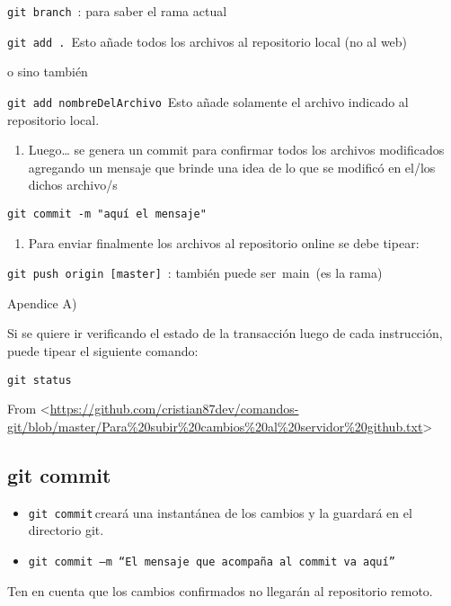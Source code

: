 \documentclass[
  a2paper,
]{article}
\providecommand{\tightlist}{%
  \setlength{\itemsep}{0pt}\setlength{\parskip}{0pt}}\usepackage{longtable,booktabs,array}
\begin{document}
\texttt{git\ branch}~: para saber el rama actual

\texttt{git\ add\ .}~Esto añade todos los archivos al repositorio local
(no al web)

o sino también

\texttt{git\ add\ nombreDelArchivo}~Esto añade solamente el archivo
indicado al repositorio local.

\begin{enumerate}
\def\labelenumi{\arabic{enumi})}
\setcounter{enumi}{1}
\tightlist
\item
  Luego\ldots{} se genera un commit para confirmar todos los archivos
  modificados agregando un mensaje que brinde una idea de lo que se
  modificó en el/los dichos archivo/s
\end{enumerate}

\texttt{git\ commit\ -m\ "aquí\ el\ mensaje"}

\begin{enumerate}
\def\labelenumi{\arabic{enumi})}
\setcounter{enumi}{2}
\tightlist
\item
  Para enviar finalmente los archivos al repositorio online se debe
  tipear:
\end{enumerate}

\texttt{git\ push\ origin~{[}master{]}}~: también puede ser~main~(es la
rama)

Apendice A)

Si se quiere ir verificando el estado de la transacción luego de cada
instrucción, puede tipear el siguiente comando:

\texttt{git\ status}

From
\textless{}\url{https://github.com/cristian87dev/comandos-git/blob/master/Para\%20subir\%20cambios\%20al\%20servidor\%20github.txt}\textgreater{}

\hypertarget{git-commit}{%
\subsection{git commit}\label{git-commit}}

\begin{itemize}
\item
  \texttt{git\ commit}\,creará una instantánea de los cambios y la
  guardará en el directorio git.
\item
  \texttt{git\ commit\ –m\ “El\ mensaje\ que\ acompaña\ al\ commit\ va\ aquí”}~~
\end{itemize}

Ten en cuenta que los cambios confirmados no llegarán al repositorio
remoto.
\end{document}

